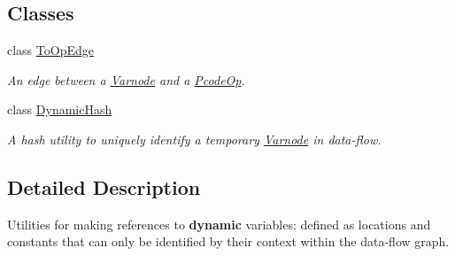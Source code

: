 \subsection*{Classes}
\begin{DoxyCompactItemize}
\item 
class \mbox{\hyperlink{class_to_op_edge}{To\+Op\+Edge}}
\begin{DoxyCompactList}\small\item\em An edge between a \mbox{\hyperlink{class_varnode}{Varnode}} and a \mbox{\hyperlink{class_pcode_op}{Pcode\+Op}}. \end{DoxyCompactList}\item 
class \mbox{\hyperlink{class_dynamic_hash}{Dynamic\+Hash}}
\begin{DoxyCompactList}\small\item\em A hash utility to uniquely identify a temporary \mbox{\hyperlink{class_varnode}{Varnode}} in data-\/flow. \end{DoxyCompactList}\end{DoxyCompactItemize}


\subsection{Detailed Description}
Utilities for making references to {\bfseries{dynamic}} variables\+: defined as locations and constants that can only be identified by their context within the data-\/flow graph. 


